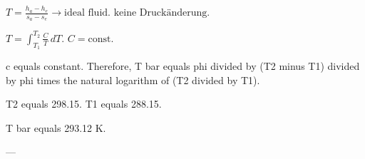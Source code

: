 \( T = \frac{h_a - h_e}{s_a - s_e} \rightarrow \text{ideal fluid} \).  
\( \text{keine Druckänderung} \).  

\( T = \int_{T_1}^{T_2} \frac{C}{T} \, dT \).  
\( C = \text{const} \).

c equals constant.  
Therefore, T bar equals phi divided by (T2 minus T1) divided by phi times the natural logarithm of (T2 divided by T1).  

T2 equals 298.15.  
T1 equals 288.15.  

T bar equals 293.12 K.  

---
